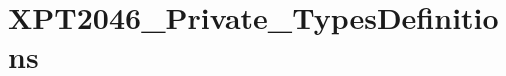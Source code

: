 \hypertarget{group___x_p_t2046___private___types_definitions}{}\section{X\+P\+T2046\+\_\+\+Private\+\_\+\+Types\+Definitions}
\label{group___x_p_t2046___private___types_definitions}
